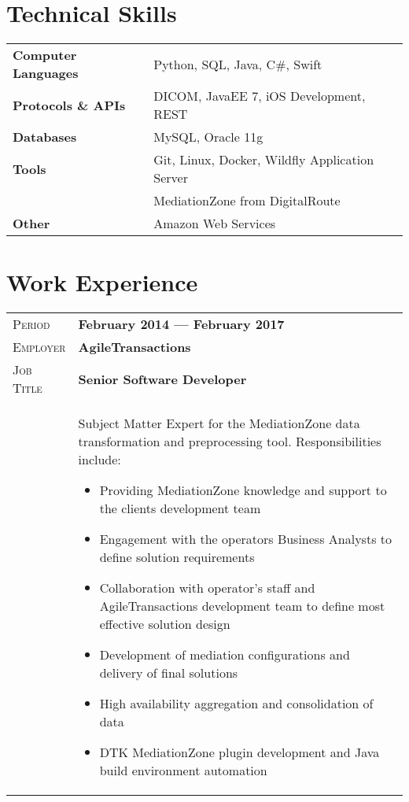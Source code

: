 \documentclass[letter, oneside, final]{scrartcl} %
\newcommand{\gray}{\rowcolor[gray]{.90}} %
\begin{document}
\begin{center}
\section{Technical Skills}

\begin{tabular}{ @{} >{\bfseries}l @{\hspace{6ex}} l }
Computer Languages & Python, SQL, Java, C\#, Swift \\
Protocols \& APIs & DICOM, JavaEE 7, iOS Development, REST\\
Databases & MySQL, Oracle 11g \\
Tools & Git, Linux, Docker, Wildfly Application Server \\
& MediationZone from DigitalRoute \\
Other & Amazon Web Services
\end{tabular}


\section{Work Experience}

\begin{tabularx}{0.97\linewidth}{>{\raggedleft\scshape}p{2cm}X}
	\gray Period & \textbf{February 2014 --- February 2017}\\
	\gray Employer & \textbf{AgileTransactions}\\
	\gray Job Title & \textbf{Senior Software Developer}\\
	& Subject Matter Expert for the MediationZone data transformation and preprocessing tool. Responsibilities include: 
	\begin{itemize}
		\item Providing MediationZone knowledge and support to the clients development team
		\item Engagement with the operators Business Analysts to define solution requirements
		\item Collaboration with operator’s staff and AgileTransactions development team to define most effective solution design
		\item Development of mediation configurations and delivery of final solutions
		\item High availability aggregation and consolidation of data
		\item DTK MediationZone plugin development and Java build environment automation
	\end{itemize}
\end{tabularx}


\end{center}
\end{document}
